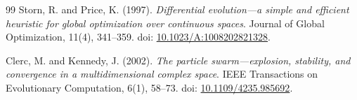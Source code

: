 \documentclass[12pt,a4paper]{article}
\begin{document}
\begin{thebibliography}{99}
Storn, R. and Price, K. (1997).
\textit{Differential evolution---a simple and efficient heuristic for global optimization over continuous spaces}.
Journal of Global Optimization, 11(4), 341--359.
doi: \href{https://doi.org/10.1023/A:1008202821328}{10.1023/A:1008202821328}.

Clerc, M. and Kennedy, J. (2002).
\textit{The particle swarm---explosion, stability, and convergence in a multidimensional complex space}.
IEEE Transactions on Evolutionary Computation, 6(1), 58--73.
doi: \href{https://doi.org/10.1109/4235.985692}{10.1109/4235.985692}.

\end{thebibliography}
\end{document}
